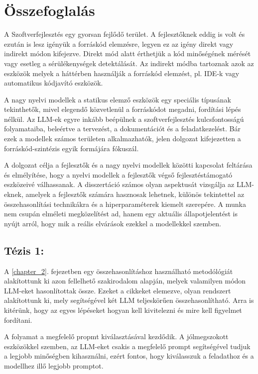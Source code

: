 \chapter*{Összefoglalás}

A Szoftverfejlesztés egy gyorsan fejlődő terület.
A fejlesztőknek eddig is volt és ezután is lesz igényük a forráskód elemzésre, legyen ez az igény direkt vagy indirekt módon kifejezve.
Direkt mód alatt érthetjük a kód minőségének mérését vagy esetleg a sérülékenységek detektálását.
Az indirekt módba tartoznak azok az eszközök melyek a háttérben használják a forráskód elemzést, pl. IDE-k vagy automatikus kódjavító eszközök.

A nagy nyelvi modellek a statikus elemző eszközök egy speciális típusának te\-kint\-he\-tők, mivel elegendő közvetlenül a forráskódot megadni, fordítási lépés nélkül.
Az LLM-ek egyre inkább beépülnek a szoftverfejlesztés kulcsfontosságú folyamataiba, beleértve a tervezést, a dokumentációt és a feladatkezelést.
Bár ezek a modellek számos területen alkalmazhatók, jelen dolgozat kifejezetten a forráskód-szintézis egyik formájára fókuszál.

A dolgozat célja a fejlesztők és a nagy nyelvi modellek közötti kapcsolat feltárása és elmélyítése, hogy a nyelvi modellek a fejlesztők végső fejlesztéstámogató esz\-kö\-ze\-i\-vé válhassanak.
A disszertáció számos olyan aspektusát vizsgálja az LLM-eknek, amelyek a fejlesztők számára hasznosak lehetnek, különös tekintettel az összehasonlítási technikákra és a hiperparaméterek kiemelt szerepére.
A munka nem csupán elméleti megközelítést ad, hanem egy aktuális állapotjelentést is nyújt arról, hogy mik a reális elvárások ezekkel a modellekkel szemben.

\section*{Tézis 1: \thesispointonehu}

A \ref{chapter_2}. fejezetben egy összehasonlításhoz használható metodólógiát alakítottunk ki azon fellelhető szakirodalom alapján, melyek valamilyen módon LLM-eket ha\-son\-lí\-tot\-tak össze.
Ezeket a cikkeket elemezve, olyan rendszert alakítottunk ki, mely segítségével két LLM teljeskörűen összehasonlítható.
Arra is kitérünk, hogy az egyes lépéseket hogyan kell kivitelezni és mire kell figyelmet fordítani.

A folyamat a megfelelő propmt kiválasztásával kezdődik.
A jólmegszokott esz\-kö\-zök\-kel szemben, az LLM-eket csakis a megfelelő prompt segítségével tudjuk a legjobb minőségben kihasználni, ezért fontos, hogy kiválasszuk a feladathoz és a modellhez illő legjobb promptot.

